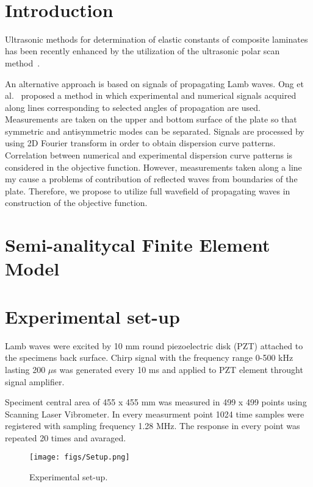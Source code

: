 \documentclass[runningheads]{llncs}
\begin{document}
%
\\[2em]
%
\section{Introduction}

Ultrasonic methods for determination of elastic constants of composite laminates has been recently enhanced by the utilization of the ultrasonic polar scan method~\cite{Martens2019a}.

An alternative approach is based on signals of propagating Lamb waves.
Ong et al.~\cite{Ong2016} proposed a method in which experimental and numerical signals acquired along lines corresponding to selected angles of propagation are used. 
Measurements are taken on the upper and bottom surface of the plate so that symmetric and antisymmetric modes can be separated.
Signals are processed by using 2D Fourier transform in order to obtain dispersion curve patterns. 
Correlation between numerical and experimental dispersion curve patterns is considered in the objective function.
However, measurements taken along a line my cause a problems of contribution of reflected waves from boundaries of the plate.
Therefore, we propose to utilize full wavefield of propagating waves in construction of the objective function.

\section{Semi-analitycal Finite Element Model}
\section{Experimental set-up}

Lamb waves were excited by 10 mm round piezoelectric disk (PZT) attached to the specimens back surface.  Chirp signal with the frequency range 0-500 kHz lasting 200 $\mu$s was generated every 10 ms and applied to PZT element throught signal amplifier. 

Speciment central area of 455 x 455 mm was measured in 499 x 499 points using Scanning Laser Vibrometer. In every measurment point 1024 time samples were registered with sampling frequency 1.28 MHz. The response in every point was repeated 20 times and avaraged. 

\begin{figure}
	\begin{center}
	\texttt{[image: figs/Setup.png]}
	\end{center}
	\caption{Experimental set-up.}
	\label{fig1}
\end{figure}
\end{document}
